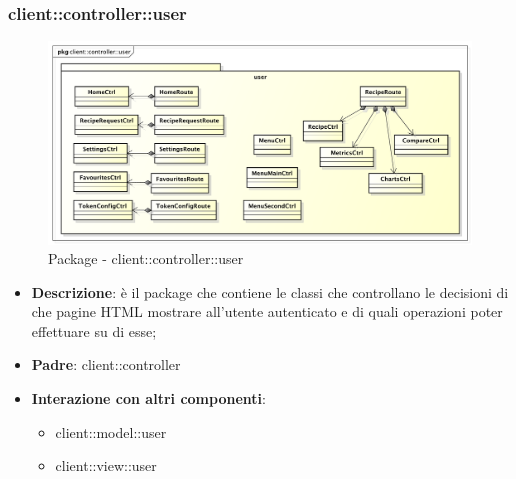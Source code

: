 


\subsubsection{client::controller::user} %
\label{ssub:bdsm_app_client_controller_user}
\begin{figure}[htbp]
	\centering
	\centerline{\includegraphics[scale=0.45]{./images/client/client_controller_user.pdf}}
	\caption{Package - client::controller::user}
\end{figure}

\begin{itemize}
	\item \textbf{Descrizione}: è il package che contiene le classi che controllano le decisioni di che pagine HTML mostrare all'utente autenticato e di quali operazioni poter effettuare su di esse;
	\item \textbf{Padre}: client::controller
	\item \textbf{Interazione con altri componenti}:
		\begin{itemize}
			\item client::model::user
			\item client::view::user
		\end{itemize}
\end{itemize}

